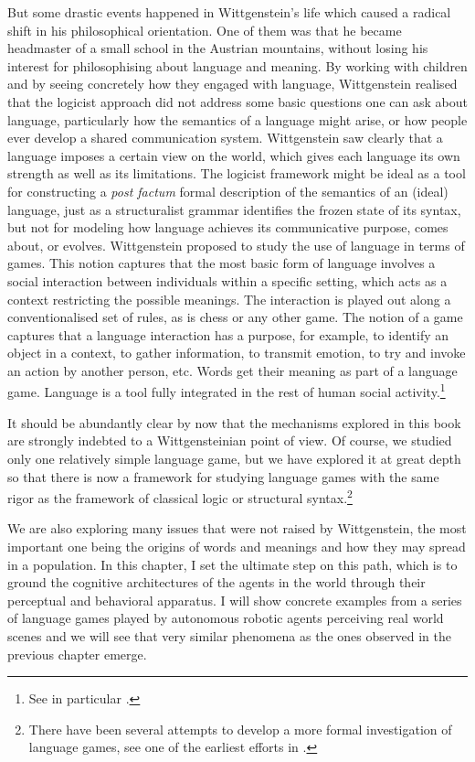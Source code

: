 But some drastic events happened in Wittgenstein's life which 
caused a radical shift in his philosophical orientation. 
One of them was that he became headmaster of a small
school in the Austrian mountains,
without losing his interest for philosophising about language and 
meaning. By working with children and by seeing concretely
how they engaged with language, Wittgenstein realised that the 
logicist approach did not address some basic questions one 
can ask about language, particularly how the semantics of a 
language might arise, or how people ever develop a shared 
communication system. Wittgenstein
saw clearly that a language imposes a certain view on the 
world, which gives each language its own strength as well as
its limitations. The logicist 
framework might be ideal as a tool for constructing a 
{\itshape post factum} formal description of the semantics of
an (ideal) language, just as a structuralist grammar identifies
the frozen state of its syntax, but
not for modeling how language achieves its communicative purpose, 
comes about, or evolves. 
\enlargethispage{1\baselineskip}
Wittgenstein proposed to study the use of language in terms of 
games. This notion captures that the most basic form of
language involves a social interaction between individuals
within a specific setting, which acts as a context restricting
the possible meanings. The interaction is played out 
along a conventionalised set of rules, as is chess or any
other game. The notion of a game captures
that a language interaction has a purpose, for example,
to identify an object in a context, to gather 
information, to transmit emotion, to try and
invoke an action by another person, etc. Words get 
their meaning as part of a language game. Language is a tool 
fully integrated in the rest of human social activity.\footnote{See in particular \cite{Wittgenstein:1953}.}

It should be abundantly clear by now that the mechanisms explored
in this book are strongly indebted to a Wittgensteinian 
point of view. Of course, we studied only one relatively 
simple language game, but we have explored it at
great depth so that there is now a framework for
studying language games with the same rigor as 
the framework of classical logic or structural syntax.\footnote{There have been several attempts to develop a 
more formal investigation of language games, see one of the 
earliest efforts in \cite{Hintikka:1998}.}

We are also exploring many issues that were not raised
by Wittgenstein, the most important one being the origins 
of words and meanings and how they may spread in 
a population. In this chapter, I set the ultimate 
step on this path, which is 
to ground the cognitive architectures of the agents
in the world through their perceptual and behavioral
apparatus. I will show concrete examples from a
series of language games played by autonomous 
robotic agents perceiving real world scenes
and we will see that very similar
phenomena as the ones observed in the previous chapter
emerge. 

